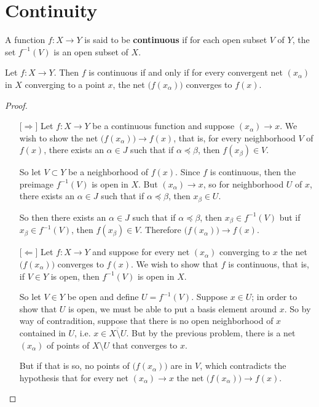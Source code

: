 \documentclass[12pt]{article}
\begin{document}
\section{Continuity}
\begin{defn}
    A function $f : X \to Y$ is said to be \textbf{continuous} if for each open subset $V$ of $Y$,
    the set $f^{-1}(V)$ is an open subset of $X$.
\end{defn}
\begin{thm}
    Let $f: X \to Y$. Then $f$ is continuous if and only if for every convergent net $(x_\alpha)$
    in $X$ converging to a point $x$, the net $\big(f(x_\alpha)\big)$ converges to $f(x)$.
\end{thm}
\begin{proof}
    \ \vspace{-0.5cm}\newline
    \begin{itemize}
        \item[$\lbrack\Rightarrow\rbrack$] Let $f: X \to Y$ be a continuous function and suppose
              $(x_\alpha) \to x$. We wish to show the net $\big(f(x_\alpha)\big) \to f(x)$, that
              is, for every neighborhood $V$ of $f(x)$, there exists an $\alpha \in J$ such that
              if $\alpha \preceq \beta$, then $f(x_\beta) \in V$.

              So let $V \subset Y$ be a neighborhood of $f(x)$. Since $f$ is continuous, then the
              preimage $f^{-1}(V)$ is open in $X$. But $(x_\alpha) \to x$, so for
              neighborhood $U$ of $x$, there exists an $\alpha \in J$ such that if
              $\alpha \preceq \beta$, then $x_\beta \in U$.

              So then there exists an $\alpha \in J$ such that if $\alpha \preceq \beta$, then
              $x_\beta \in f^{-1}(V)$ but if $x_\beta \in f^{-1}(V)$, then $f(x_\beta) \in V$.
              Therefore $\big(f(x_\alpha)\big) \to f(x)$.
        \item[$\lbrack\Leftarrow\rbrack$] Let $f: X \to Y$ and suppose for every net $(x_\alpha)$
              converging to $x$ the net $\big(f(x_\alpha)\big)$ converges to $f(x)$. We wish to
              show that $f$ is continuous, that is, if $V \in Y$ is open, then $f^{-1}(V)$ is open
              in $X$.

              So let $V \in Y$ be open and define $U = f^{-1}(V)$. Suppose $x \in U$; in order to
              show that $U$ is open, we must be able to put a basis element around $x$. So by way
              of contradition, suppose that there is no open neighborhood of $x$ contained in $U$,
              i.e. $x \in \overline{X \setminus U}$. But by the previous problem, there is a net
              $(x_\alpha)$ of points of $X \setminus U$ that converges to $x$.

              But if that is so, no points of $\big(f(x_\alpha)\big)$ are in $V$, which
              contradicts the hypothesis that for every net $(x_\alpha) \to x$ the net
              $\big(f(x_\alpha)\big) \to f(x)$.
    \end{itemize}
\end{proof}
\end{document}
